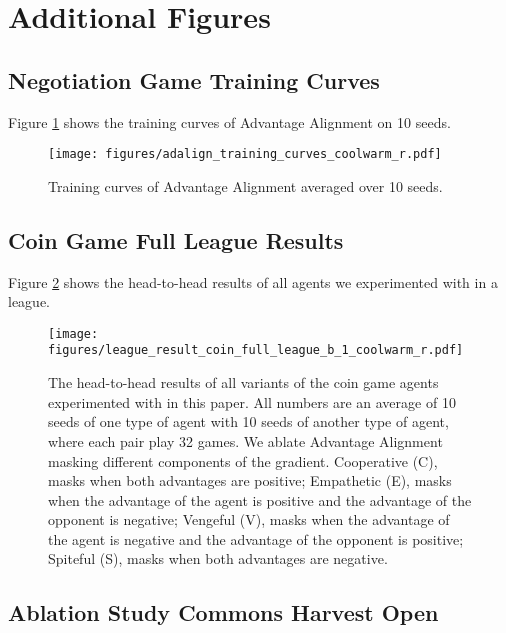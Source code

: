 \documentclass{article} \usepackage{iclr2025_conference,times}
\begin{document}
\newpage
\section{Additional Figures}

\subsection{Negotiation Game Training Curves}

Figure \ref{app:neg_training_curves} shows the training curves of Advantage Alignment on 10 seeds.
\begin{figure}[h] \centering
  \texttt{[image:  figures/adalign\_training\_curves\_coolwarm\_r.pdf]}
  \caption{Training curves of Advantage Alignment averaged over 10 seeds.}
  \label{app:neg_training_curves}
\end{figure}

\subsection{Coin Game Full League Results}

Figure \ref{app:full_league_coin_adaling} shows the head-to-head results of all agents we experimented with in a league.
\begin{figure}[h] \centering
  \texttt{[image:  figures/league\_result\_coin\_full\_league\_b\_1\_coolwarm\_r.pdf]}
  \caption{The head-to-head results of all variants of the coin game agents experimented with in this paper. All numbers are an average of 10 seeds of one type of agent with 10 seeds of another type of agent, where each pair play 32 games. We ablate Advantage Alignment masking different components of the gradient. Cooperative (C), masks when both advantages are positive; Empathetic (E), masks when the advantage of the agent is positive and the advantage of the opponent is negative; Vengeful (V), masks when the advantage of the agent is negative and the advantage of the opponent is positive;  Spiteful (S), masks when both advantages are negative.}
  \label{app:full_league_coin_adaling}
\end{figure}

\subsection{Ablation Study Commons Harvest Open}
\end{document}
